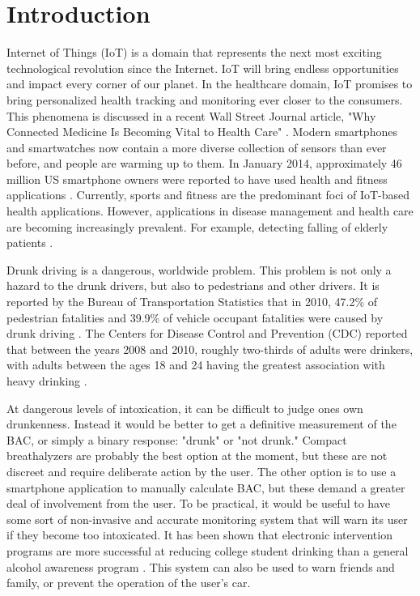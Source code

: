 \section{Introduction}

Internet of Things (IoT) is a domain that represents the next most exciting technological revolution since the Internet. IoT will bring endless opportunities and impact every corner of our planet. In the healthcare domain, IoT promises to bring personalized health tracking and monitoring ever closer to the consumers. This phenomena is discussed in a recent Wall Street Journal article, "Why Connected Medicine Is Becoming Vital to Health Care" \cite{Landro:2015}. Modern smartphones and smartwatches now contain a more diverse collection of sensors than ever before, and people are warming up to them. In January 2014, approximately 46 million US smartphone owners were reported to have used health and fitness applications \cite{Nielsen:2014}. Currently, sports and fitness are the predominant foci of IoT-based health applications. However, applications in disease management and health care are becoming increasingly prevalent. For example, detecting falling of elderly patients \cite{Tacconi:2011}. 

Drunk driving is a dangerous, worldwide problem. This problem is not only a hazard to the drunk drivers, but also to pedestrians and other drivers. It is reported by the Bureau of Transportation Statistics that in 2010, 47.2\% of pedestrian fatalities and 39.9\% of vehicle occupant fatalities were caused by drunk driving \cite{Chambers:2012}. The Centers for Disease Control and Prevention (CDC) reported that between the years 2008 and 2010, roughly two-thirds of adults were drinkers, with adults between the ages 18 and 24 having the greatest association with heavy drinking \cite{Schoenborn:2013}. 

At dangerous levels of intoxication, it can be difficult to judge ones own drunkenness. Instead it would be better to get a definitive measurement of the BAC, or simply a binary response: "drunk" or "not drunk." Compact breathalyzers are probably the best option at the moment, but these are not discreet and require deliberate action by the user. The other option is to use a smartphone application to manually calculate BAC, but these demand a greater deal of involvement from the user. To be practical, it would be useful to have some sort of non-invasive and accurate monitoring system that will warn its user if they become too intoxicated. It has been shown that electronic intervention programs are more successful at reducing college student drinking than a general alcohol awareness program \cite{Ward:2015}. This system can also be used to warn friends and family, or prevent the operation of the user's car.

